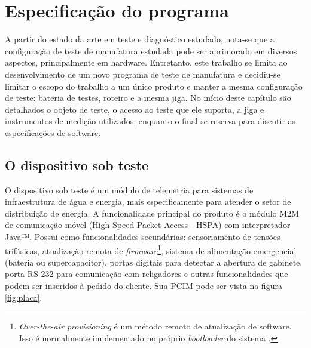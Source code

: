 \chapter{Especificação do programa}
\label{specs}








A partir do estado da arte em teste e diagnóstico estudado, nota-se que a configuração de teste de manufatura estudada pode ser aprimorado em diversos aspectos, principalmente em hardware. Entretanto, este trabalho se limita ao desenvolvimento de um novo programa de teste de manufatura e decidiu-se limitar o escopo do trabalho a um único produto e manter a mesma configuração de teste: bateria de testes, roteiro e a mesma jiga. No início deste capítulo são detalhados o objeto de teste, o acesso ao teste que ele suporta, a jiga e instrumentos de medição utilizados, enquanto o final se reserva para discutir as especificações de software.

\section{O dispositivo sob teste}

    O dispositivo sob teste é um módulo de telemetria para sistemas de infraestrutura de água e energia, mais especificamente para atender o setor de distribuição de energia. A funcionalidade principal do produto é o módulo M2M de comunicação móvel (High Speed Packet Access - HSPA) com interpretador Java™. Possui como funcionalidades secundárias: sensoriamento de tensões trifásicas, atualização remota de \textit{firmware}\footnote{\textit{Over-the-air provisioning} é um método remoto de atualização de software. Isso é normalmente implementado no próprio \textit{bootloader} do sistema \citep{jacobbeningo2013}.}, sistema de alimentação emergencial (bateria ou supercapacitor), portas digitais para detectar a abertura de gabinete, porta RS-232 para comunicação com religadores e outras funcionalidades que podem ser inseridos à pedido do cliente. Sua PCIM pode ser vista na figura \ref{fig:placa}. 
    
